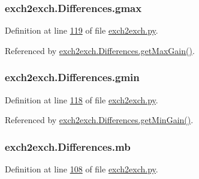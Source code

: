\subsubsection[{\texorpdfstring{gmax}{gmax}}]{\setlength{\rightskip}{0pt plus 5cm}exch2exch.\+Differences.\+gmax}\hypertarget{classexch2exch_1_1_differences_a569f2a6fa0e33ad725c3c3ada259ddcc}{}\label{classexch2exch_1_1_differences_a569f2a6fa0e33ad725c3c3ada259ddcc}


Definition at line \hyperlink{exch2exch_8py_source_l00119}{119} of file \hyperlink{exch2exch_8py_source}{exch2exch.\+py}.



Referenced by \hyperlink{exch2exch_8py_source_l00136}{exch2exch.\+Differences.\+get\+Max\+Gain()}.

\subsubsection[{\texorpdfstring{gmin}{gmin}}]{\setlength{\rightskip}{0pt plus 5cm}exch2exch.\+Differences.\+gmin}\hypertarget{classexch2exch_1_1_differences_a33c9add531b5b46c49ae322657343382}{}\label{classexch2exch_1_1_differences_a33c9add531b5b46c49ae322657343382}


Definition at line \hyperlink{exch2exch_8py_source_l00118}{118} of file \hyperlink{exch2exch_8py_source}{exch2exch.\+py}.



Referenced by \hyperlink{exch2exch_8py_source_l00133}{exch2exch.\+Differences.\+get\+Min\+Gain()}.

\subsubsection[{\texorpdfstring{mb}{mb}}]{\setlength{\rightskip}{0pt plus 5cm}exch2exch.\+Differences.\+mb}\hypertarget{classexch2exch_1_1_differences_a81c81e9c15b5ea8a5d39bb99d85250e1}{}\label{classexch2exch_1_1_differences_a81c81e9c15b5ea8a5d39bb99d85250e1}


Definition at line \hyperlink{exch2exch_8py_source_l00108}{108} of file \hyperlink{exch2exch_8py_source}{exch2exch.\+py}.

